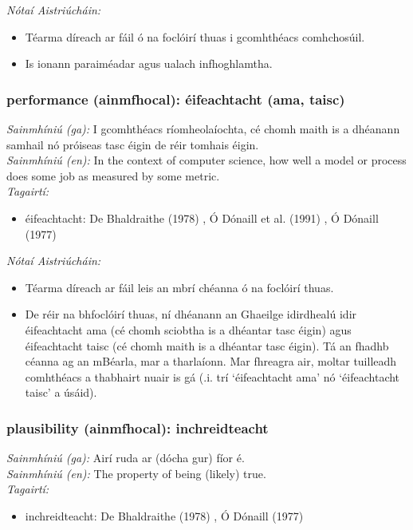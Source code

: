  \noindent \textit{Nótaí Aistriúcháin:}
\begin{itemize}
	\item Téarma díreach ar fáil ó na foclóirí thuas i gcomhthéacs comhchosúil.
	\item Is ionann paraiméadar agus ualach infhoghlamtha.
\end{itemize}


\subsubsection*{performance (ainmfhocal): éifeachtacht (ama, taisc)}
 \noindent \textit{Sainmhíniú (ga):} I gcomhthéacs ríomheolaíochta, cé chomh maith is a dhéanann samhail nó próiseas tasc éigin de réir tomhais éigin.
\\
 \noindent \textit{Sainmhíniú (en):} In the context of computer science, how well a model or process does some job as measured by some metric.
\\
 \noindent \textit{Tagairtí:}
\begin{itemize}
	\item éifeachtacht: De Bhaldraithe (1978) \cite{de-bhaldraithe}, Ó Dónaill et al. (1991) \cite{focloir-beag}, Ó Dónaill (1977) \cite{odonaill}
\end{itemize}

 \noindent \textit{Nótaí Aistriúcháin:}
\begin{itemize}
	\item Téarma díreach ar fáil leis an mbrí chéanna ó na foclóirí thuas.
	\item De réir na bhfoclóirí thuas, ní dhéanann an Ghaeilge idirdhealú idir éifeachtacht ama (cé chomh sciobtha is a dhéantar tasc éigin) agus éifeachtacht taisc (cé chomh maith is a dhéantar tasc éigin). Tá an fhadhb céanna ag an mBéarla, mar a tharlaíonn. Mar fhreagra air, moltar tuilleadh comhthéacs a thabhairt nuair is gá (.i. trí `éifeachtacht ama' nó `éifeachtacht taisc' a úsáid).
\end{itemize}


\subsubsection*{plausibility (ainmfhocal): inchreidteacht}
 \noindent \textit{Sainmhíniú (ga):} Airí ruda ar (dócha gur) fíor é.
\\
 \noindent \textit{Sainmhíniú (en):} The property of being (likely) true.
\\
 \noindent \textit{Tagairtí:}
\begin{itemize}
	\item inchreidteacht: De Bhaldraithe (1978) \cite{de-bhaldraithe}, Ó Dónaill (1977) \cite{odonaill}
\end{itemize}

